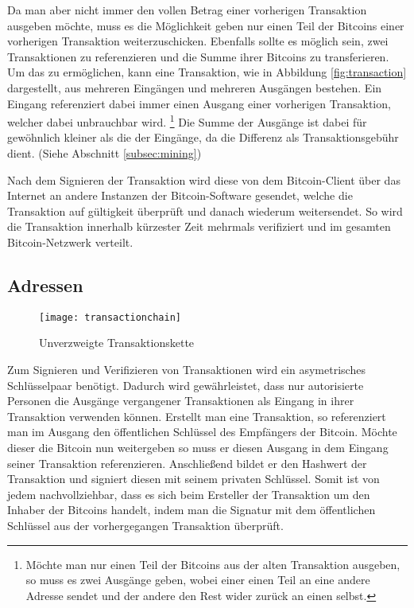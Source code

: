 Da man aber nicht immer den vollen Betrag einer vorherigen Transaktion ausgeben möchte, muss es die Möglichkeit geben nur einen Teil der Bitcoins einer vorherigen Transaktion weiterzuschicken.
Ebenfalls sollte es möglich sein, zwei Transaktionen zu referenzieren und die Summe ihrer Bitcoins zu transferieren.
Um das zu ermöglichen, kann eine Transaktion, wie in Abbildung \ref{fig:transaction} dargestellt, aus mehreren Eingängen und mehreren Ausgängen bestehen.
Ein Eingang referenziert dabei immer einen Ausgang einer vorherigen Transaktion, welcher dabei unbrauchbar wird.%
\footnote{Möchte man nur einen Teil der Bitcoins aus der alten Transaktion ausgeben, so muss es zwei Ausgänge geben, wobei einer einen Teil an eine andere Adresse sendet und der andere den Rest wider zurück an einen selbst.}
Die Summe der Ausgänge ist dabei für gewöhnlich kleiner als die der Eingänge, da die Differenz als Transaktionsgebühr dient. (Siehe Abschnitt \ref{subsec:mining})

Nach dem Signieren der Transaktion wird diese von dem Bitcoin-Client über das Internet an andere Instanzen der Bitcoin-Software gesendet, welche die Transaktion auf gültigkeit überprüft und danach wiederum weitersendet.
So wird die Transaktion innerhalb kürzester Zeit mehrmals verifiziert und im gesamten Bitcoin-Netzwerk verteilt.

\subsection{Adressen}

\begin{figure}
    \begin{center}
        \texttt{[image: transactionchain]}
    	\caption{Unverzweigte Transaktionskette \parencite[2]{nakamoto}}
    	\label{fig:transactionchain}
    \end{center}
\end{figure}

Zum Signieren und Verifizieren von Transaktionen wird ein asymetrisches Schlüsselpaar benötigt.
Dadurch wird gewährleistet, dass nur autorisierte Personen die Ausgänge vergangener Transaktionen als Eingang in ihrer Transaktion verwenden können.
Erstellt man eine Transaktion, so referenziert man im Ausgang den öffentlichen Schlüssel des Empfängers der Bitcoin.
Möchte dieser die Bitcoin nun weitergeben so muss er diesen Ausgang in dem Eingang seiner Transaktion referenzieren.
Anschließend bildet er den Hashwert der Transaktion und signiert diesen mit seinem privaten Schlüssel.
Somit ist von jedem nachvollziehbar, dass es sich beim Ersteller der Transaktion um den Inhaber der Bitcoins handelt, indem man die Signatur mit dem öffentlichen Schlüssel aus der vorhergegangen Transaktion überprüft.

